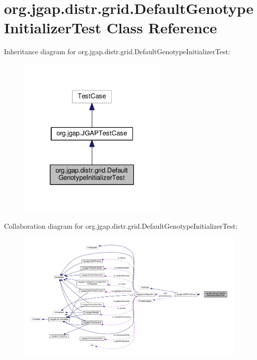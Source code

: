 \hypertarget{classorg_1_1jgap_1_1distr_1_1grid_1_1_default_genotype_initializer_test}{\section{org.\-jgap.\-distr.\-grid.\-Default\-Genotype\-Initializer\-Test Class Reference}
\label{classorg_1_1jgap_1_1distr_1_1grid_1_1_default_genotype_initializer_test}
}


Inheritance diagram for org.\-jgap.\-distr.\-grid.\-Default\-Genotype\-Initializer\-Test\-:
\nopagebreak
\begin{figure}[H]
\begin{center}
\leavevmode
\includegraphics[width=206pt]{classorg_1_1jgap_1_1distr_1_1grid_1_1_default_genotype_initializer_test__inherit__graph}
\end{center}
\end{figure}


Collaboration diagram for org.\-jgap.\-distr.\-grid.\-Default\-Genotype\-Initializer\-Test\-:
\nopagebreak
\begin{figure}[H]
\begin{center}
\leavevmode
\includegraphics[width=350pt]{classorg_1_1jgap_1_1distr_1_1grid_1_1_default_genotype_initializer_test__coll__graph}
\end{center}
\end{figure}
